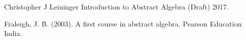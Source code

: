 \documentclass[11pt]{elegantbook}
\begin{document}
\begin{thebibliography}{1}
    Christopher J Leininger  \newblock Introduction to Abstract Algebra
    (Draft)  2017.

    Fraleigh, J. B. (2003). A first course in abstract algebra. Pearson Education India.
\end{thebibliography}
\end{document}
